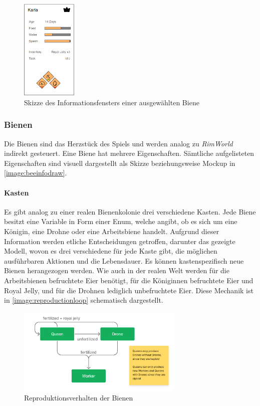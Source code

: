 \begin{figure}
    \begin{center}
        \includegraphics[width=100px]{0.bilder/beeinfodraw.PNG}
    \end{center}
    \caption{Skizze des Informationsfensters einer ausgewählten Biene} \label{image:beeinfodraw}
\end{figure}

\subsubsection{Bienen}
Die Bienen sind das Herzstück des Spiels und werden analog zu \textit{RimWorld} indirekt gesteuert. Eine Biene hat mehrere Eigenschaften. Sämtliche aufgelisteten Eigenschaften sind visuell dargestellt als Skizze beziehungsweise Mockup in \autoref{image:beeinfodraw}.

\paragraph{Kasten}
Es gibt analog zu einer realen Bienenkolonie drei verschiedene Kasten. Jede Biene besitzt eine Variable in Form einer Enum, welche angibt, ob es sich um eine Königin, eine Drohne oder eine Arbeitsbiene handelt. Aufgrund dieser Information werden etliche Entscheidungen getroffen, darunter das gezeigte Modell, wovon es drei verschiedene für jede Kaste gibt, die möglichen ausführbaren Aktionen und die Lebensdauer. Es können kastenspezifisch neue Bienen herangezogen werden. Wie auch in der realen Welt werden für die Arbeitsbienen befruchtete Eier benötigt, für die Königinnen befruchtete Eier und Royal Jelly, und für die Drohnen lediglich unbefruchtete Eier. Diese Mechanik ist in \autoref{image:reproductionloop} schematisch dargestellt.

\begin{figure}
    \begin{center}
        \includegraphics[width=300px]{0.bilder/reproductionloop.png}
    \end{center}
    \caption{Reproduktionsverhalten der Bienen} \label{image:reproductionloop}
\end{figure}

